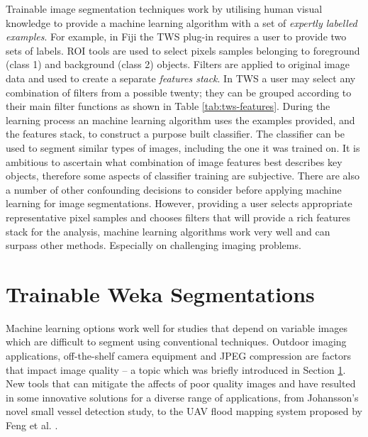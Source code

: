 Trainable image segmentation techniques work by utilising human visual knowledge to provide a machine learning algorithm with a set of \emph{expertly labelled examples}. For example, in Fiji the \ac{TWS} plug-in \cite{Kaynig2010} requires a user to provide two sets of labels. \ac{ROI} tools are used to select pixels samples belonging to foreground (class 1) and background (class 2) objects. Filters are applied to original image data and used to create a separate \emph{features stack}. In \ac{TWS} a user may select any combination of filters from a possible twenty; they can be grouped according to their main filter functions as shown in Table \ref{tab:tws-features}. During the learning process an machine learning algorithm uses the examples provided, and the features stack, to construct a purpose built classifier. The classifier can be used to segment similar types of images, including the one it was trained on. It is ambitious to ascertain what combination of image features best describes key objects, therefore some aspects of classifier training are  subjective. There are also a number of other confounding decisions to consider before applying machine learning for image segmentations. However, providing a user selects appropriate representative pixel samples and chooses filters that will provide a rich features stack for the analysis, machine learning algorithms work very well and can surpass other methods. Especially on challenging imaging problems.

\section{Trainable Weka Segmentations}
Machine learning options work well for studies that depend on variable images which are difficult to segment using conventional techniques. Outdoor imaging applications, off-the-shelf camera equipment and \ac{JPEG} compression are factors that impact image quality -- a topic which was briefly introduced in Section \ref{}. New tools that can mitigate the affects of poor quality images and have resulted in some innovative solutions for a diverse range of applications, from Johansson's \cite{Johansson2011} novel small vessel detection study, to the \ac{UAV} flood mapping system proposed by Feng et al. \cite{Feng2015a,Feng2015b}.

